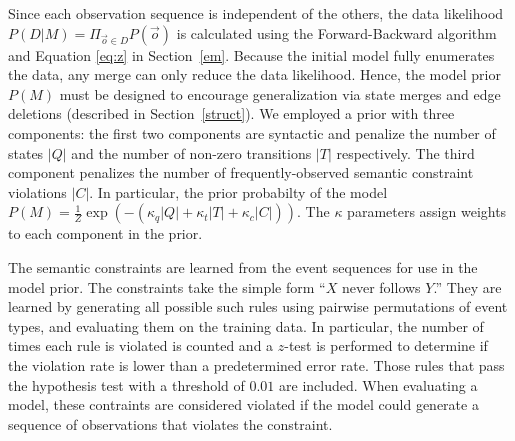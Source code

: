 \documentclass[letterpaper]{article}
\begin{document}
Since each observation sequence is independent of the others, 
the data likelihood $P(D|M) = \Pi_{\vec{o} \in D} P(\vec{o})$ is calculated 
using the Forward-Backward algorithm and Equation \ref{eq:z} in
Section~\ref{em}. Because the initial model fully enumerates the data, any merge can only reduce the data likelihood. Hence, the model prior $P(M)$ must be designed to encourage generalization via state merges and edge deletions (described in Section~\ref{struct}). We employed a prior with three components: the first two components are syntactic and penalize the number of states $|Q|$ and the number of non-zero transitions $|T|$ respectively. The third component penalizes the number of frequently-observed semantic constraint violations $|C|$. In particular, the prior probabilty of the model  $P(M) = \frac{1}{Z}\exp( -(\kappa_q |Q| + \kappa_t |T| +\kappa_c |C|))$.
The $\kappa$ parameters assign weights to each component in the prior. 


The semantic constraints are learned from the event sequences for use in the model prior.  The constraints take the simple form ``$X$ never follows $Y$.''  They are learned by generating all possible such rules using 
pairwise permutations of event types, and evaluating them on the training data. 
In particular, the number of times each rule is violated is counted and a $z$-test is performed to determine if the violation rate is lower than a predetermined error rate. Those rules that pass the hypothesis test with a threshold of $0.01$ are included.  When evaluating a model, these contraints are considered violated if the model could generate a sequence of observations that violates the constraint. %
\end{document}
